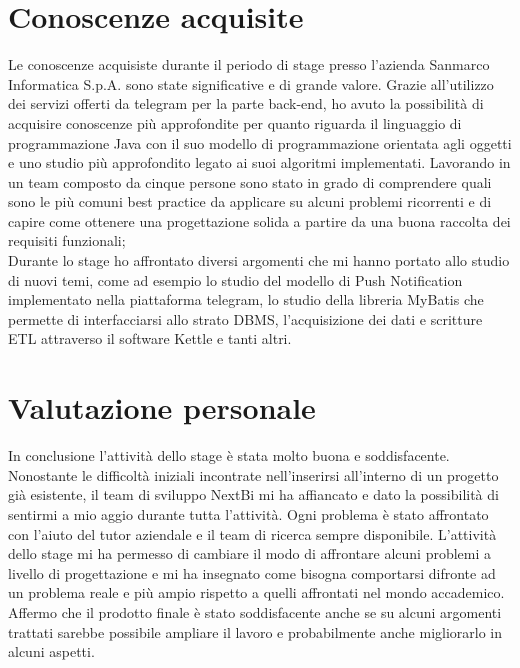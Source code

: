 \section{Conoscenze acquisite}
Le conoscenze acquisiste durante il periodo di stage presso l'azienda Sanmarco Informatica S.p.A. sono state significative e di grande valore. Grazie all'utilizzo dei servizi offerti da telegram per la parte back-end, ho avuto la possibilità di acquisire conoscenze più approfondite per quanto riguarda il linguaggio di programmazione Java con il suo modello di programmazione orientata agli oggetti e uno studio più approfondito legato ai suoi algoritmi implementati. Lavorando in un team composto da cinque persone sono stato in grado di comprendere quali sono le più comuni best practice da applicare su alcuni problemi ricorrenti e di capire  come ottenere una progettazione solida a partire da una buona raccolta dei requisiti funzionali; \\ Durante lo stage ho affrontato diversi argomenti che mi hanno portato allo studio di nuovi temi, come ad esempio lo studio del modello di Push Notification implementato nella piattaforma telegram, lo studio della libreria MyBatis che permette di interfacciarsi allo strato DBMS, l'acquisizione dei dati e scritture ETL attraverso il software Kettle e tanti altri. 

\section{Valutazione personale}

In conclusione l'attività dello stage è stata molto buona e soddisfacente. Nonostante le difficoltà iniziali incontrate nell'inserirsi all'interno di un progetto già esistente, il team di sviluppo NextBi mi ha affiancato e dato la possibilità di sentirmi a mio aggio durante tutta l'attività.
Ogni problema è stato affrontato con l'aiuto del tutor aziendale e il team di ricerca sempre disponibile.
L'attività dello stage mi ha permesso di cambiare il modo di affrontare alcuni problemi a livello di progettazione e mi ha insegnato come bisogna comportarsi difronte ad un problema reale e più ampio rispetto a quelli affrontati nel mondo accademico. Affermo che il prodotto finale è stato soddisfacente anche se su alcuni argomenti trattati sarebbe possibile ampliare il lavoro e probabilmente anche migliorarlo in alcuni aspetti.







 